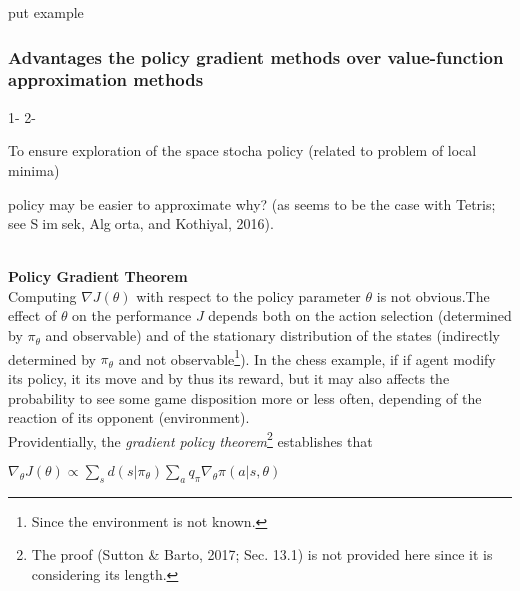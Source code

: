\documentclass[11pt, onecolumn, a4paper]{report}
\begin{document}
put example

\subsubsection{Advantages the policy gradient methods over value-function approximation methods}

1- 
2-

To ensure exploration of the space stocha policy (related to problem of local minima)

 policy may be easier to approximate why?
(as seems to be the case with Tetris; see
Simsek, Algorta, and Kothiyal, 2016).

\begin{table}
\caption {Comparing policy gradients methods and Value-function approximation methods} \label{tab:title} 
\end{table} \\

\textbf{Policy Gradient Theorem}\\

Computing $\nabla J(\theta) $ with respect to the policy parameter $\theta$ is not obvious.The effect of $\theta$ on the performance $J$ depends both on the action selection (determined by $\pi_\theta$ and observable) and of the stationary distribution of the states (indirectly determined by $\pi_\theta$ and not observable\footnote{Since the environment is not known.}). In the chess example, if if agent modify its policy, it its move and by thus its reward, but it may also affects the probability to see some game disposition more or less often, depending of  the reaction of its opponent (environment).\\

Providentially, the \textit{gradient policy theorem}\footnote{The proof (Sutton & Barto, 2017; Sec. 13.1)  is not provided here since it is considering its length.} establishes that
\begin{center}
$\nabla_\theta J(\theta) \propto  \sum_s d(s|\pi_\theta) \sum_a q_\pi\nabla_\theta \pi(a|s,\theta)$
\end{center}
\end{document}
